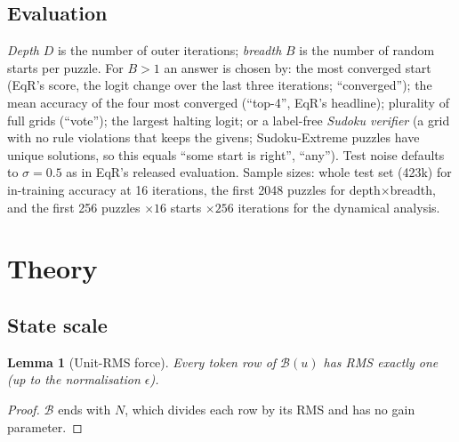 \documentclass[11pt]{article}
\newtheorem{lemma}[proposition]{Lemma}
\theoremstyle{definition}
\newcommand{\Bk}{\mathcal{B}}
\begin{document}
\subsection{Evaluation}
\emph{Depth} $D$ is the number of outer iterations; \emph{breadth} $B$ is the number of random starts per puzzle. For $B>1$ an answer
is chosen by: the most converged start (EqR's score, the logit change over the last three iterations; ``converged''); the mean
accuracy of the four most converged (``top-4'', EqR's headline); plurality of full grids (``vote''); the largest halting logit;
or a label-free \emph{Sudoku verifier} (a grid with no rule violations that keeps the givens; Sudoku-Extreme puzzles have unique
solutions, so this equals ``some start is right'', ``any''). Test noise defaults to $\sigma=0.5$ as in EqR's released
evaluation. Sample sizes: whole test set (423k) for in-training accuracy at 16 iterations, the first 2048 puzzles for
depth$\times$breadth, and the first 256 puzzles $\times16$ starts $\times256$ iterations for the dynamical analysis.

\section{Theory}\label{sec:theory}

\subsection{State scale}

\begin{lemma}[Unit-RMS force]\label{lem:unit}
Every token row of $\Bk(u)$ has RMS exactly one (up to the normalisation $\epsilon$).
\end{lemma}
\begin{proof}$\Bk$ ends with $N$, which divides each row by its RMS and has no gain parameter.\end{proof}
\end{document}
